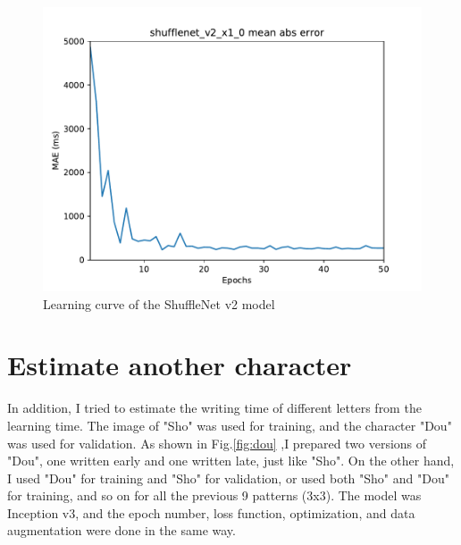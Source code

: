 \documentclass[10pt,twocolumn,letterpaper]{article}
\begin{document}
\begin{figure}[h]
    \begin{center}
        \includegraphics[width=0.8\linewidth]{images/shufflenet_v2_x1_0.pdf}
    \end{center}
    \caption{Learning curve of the ShuffleNet v2 model}
    \label{fig:shufflenet}
\end{figure}

\section{Estimate another character}
In addition, I tried to estimate the writing time of different letters from the learning time.
The image of "Sho" was used for training, and the character "Dou" was used for validation.
As shown in Fig.\ref{fig:dou} ,I prepared two versions of "Dou", one written early and one written late, just like "Sho".
On the other hand, I used "Dou" for training and "Sho" for validation,
or used both "Sho" and "Dou" for training,
and so on for all the previous 9 patterns (3x3).
The model was Inception v3, and the epoch number, loss function, optimization,
and data augmentation were done in the same way.
\end{document}
